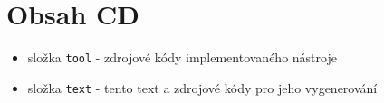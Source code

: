 
\chapter{Obsah CD}
\begin{itemize}
	\item složka \texttt{tool} - zdrojové kódy implementovaného nástroje
	\item složka \texttt{text} - tento text a zdrojové kódy pro jeho vygenerování
\end{itemize}